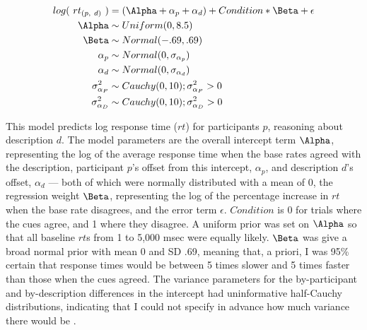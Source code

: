 \begin{equation}
  \begin{split}
    log(\ rt_{(p,\ d)}\ ) &=  (\Alpha + \alpha_p + \alpha_d)
    + Condition * \Beta + \epsilon \\
    \Alpha &\sim Uniform(0, 8.5) \\
    \Beta &\sim Normal(-.69, .69) \\
    \alpha_p &\sim Normal(0, \sigma_{\alpha_p}) \\
    \alpha_d &\sim Normal(0, \sigma_{\alpha_d}) \\
    \sigma^2_{\alpha_P} &\sim Cauchy(0, 10); \sigma^2_{\alpha_P} > 0 \\
    \sigma^2_{\alpha_D} &\sim Cauchy(0, 10); \sigma^2_{\alpha_D} > 0
  \end{split}
\end{equation}

This model predicts log response time ($rt$)
for participants $p$, reasoning about description $d$.
The model parameters are the overall intercept term $\Alpha$,
representing the log of the average response time when
the base rates agreed with the description,
participant $p$'s offset from this intercept, $\alpha_p$,
and description $d$'s offset, $\alpha_d$
--- both of which were normally distributed with a mean of 0,
the regression weight $\Beta$,
representing the log of the percentage increase in $rt$ when the base rate disagrees,
and the error term $\epsilon$.
$Condition$ is 0 for trials where the cues agree,
and 1 where they disagree.
A uniform prior was  set on $\Alpha$ so that
all baseline $rt$s from 1 to 5,000 msec were equally likely.
$\Beta$ was give a broad normal prior with mean 0 and SD .69,
meaning that, a priori, I was 95\% certain that
response times would be between 5 times slower and 5 times faster
than those when the cues agreed.
The variance parameters for the
by-participant and by-description differences in the intercept
had uninformative half-Cauchy distributions,
indicating that I could not specify in advance
how much variance there would be \citep{Gelman2006b}.
